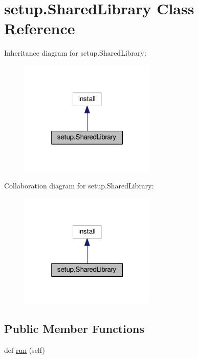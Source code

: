 \hypertarget{classsetup_1_1SharedLibrary}{}\section{setup.\+Shared\+Library Class Reference}
\label{classsetup_1_1SharedLibrary}


Inheritance diagram for setup.\+Shared\+Library\+:
\nopagebreak
\begin{figure}[H]
\begin{center}
\leavevmode
\includegraphics[width=184pt]{classsetup_1_1SharedLibrary__inherit__graph}
\end{center}
\end{figure}


Collaboration diagram for setup.\+Shared\+Library\+:
\nopagebreak
\begin{figure}[H]
\begin{center}
\leavevmode
\includegraphics[width=184pt]{classsetup_1_1SharedLibrary__coll__graph}
\end{center}
\end{figure}
\subsection*{Public Member Functions}
\begin{DoxyCompactItemize}
\item 
def \mbox{\hyperlink{classsetup_1_1SharedLibrary_abebc0f98b630cdcaa06069569f94b61b}{run}} (self)
\end{DoxyCompactItemize}


